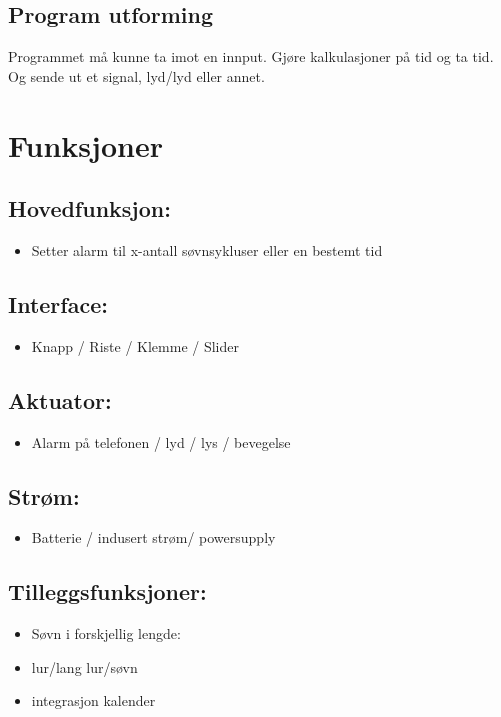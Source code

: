\documentclass[12pt, a4paper]{article}
\begin{document}
\subsection*{Program utforming}
Programmet må kunne ta imot en innput. Gjøre kalkulasjoner på tid og ta tid. 
Og sende ut et signal, lyd/lyd eller annet. 

\section{Funksjoner}

\subsection {Hovedfunksjon:}
\begin{itemize}
    \item Setter alarm til x-antall søvnsykluser eller en bestemt tid
\end{itemize}


\subsection {Interface: }
\begin{itemize}
    \item Knapp / Riste / Klemme / Slider
\end{itemize}


\subsection {Aktuator:}
\begin{itemize}
    \item Alarm på telefonen / lyd / lys / bevegelse
\end{itemize}


\subsection {Strøm: }
\begin{itemize}
    \item Batterie / indusert strøm/ powersupply
\end{itemize}



\subsection {Tilleggsfunksjoner: }
\begin{itemize}
    \item Søvn i forskjellig lengde: 
    \item lur/lang lur/søvn
    \item integrasjon kalender
\end{itemize}
\end{document}
